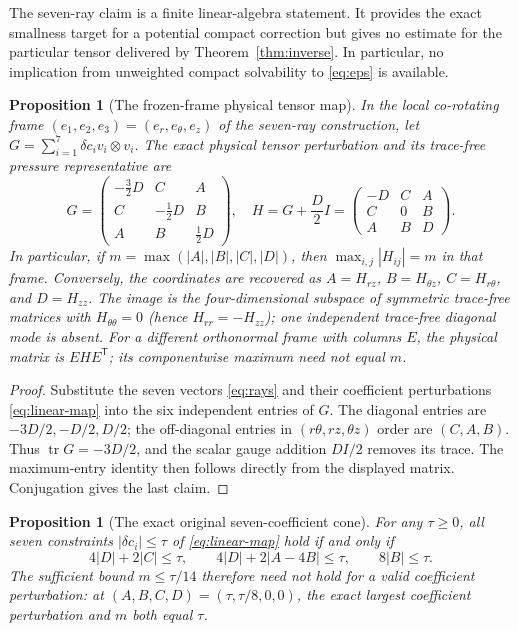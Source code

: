 \documentclass[11pt,a4paper]{article}
\theoremstyle{plain}
\newtheorem{proposition}[theorem]{Proposition}
\theoremstyle{definition}
\begin{document}
The seven-ray claim is a finite linear-algebra statement. It provides
the exact smallness target for a potential compact correction but gives
no estimate for the particular tensor delivered by
Theorem~\ref{thm:inverse}. In particular, no implication from
unweighted compact solvability to \eqref{eq:eps} is available.

\begin{proposition}[The frozen-frame physical tensor map]\label{prop:frame}
In the local co-rotating frame $(e_1,e_2,e_3)=(e_r,e_\theta,e_z)$
of the seven-ray construction, let
$G=\sum_{i=1}^7\delta c_i v_i\otimes v_i$.
The exact physical tensor perturbation and its trace-free pressure
representative are
\begin{equation}\label{eq:four-field-map}
 G=\begin{pmatrix}
 -\frac32D&C&A\\ C&-\frac12D&B\\ A&B&\frac12D
 \end{pmatrix},\quad
 H=G+\frac D2 I
 =\begin{pmatrix}-D&C&A\\ C&0&B\\ A&B&D\end{pmatrix}.
\end{equation}
In particular, if $m=\max(|A|,|B|,|C|,|D|)$, then
$\max_{i,j}|H_{ij}|=m$ in that frame.
Conversely, the coordinates are recovered as
$A=H_{rz}$, $B=H_{\theta z}$, $C=H_{r\theta}$, and $D=H_{zz}$.
The image is the four-dimensional subspace of symmetric trace-free
matrices with $H_{\theta\theta}=0$ (hence $H_{rr}=-H_{zz}$);
one independent trace-free diagonal mode is absent.
For a different orthonormal frame with columns $E$, the physical matrix
is $EHE^{\mathsf T}$; its componentwise maximum need not equal $m$.
\end{proposition}

\begin{proof}
Substitute the seven vectors \eqref{eq:rays} and their coefficient
perturbations \eqref{eq:linear-map} into the six independent entries
of $G$. The diagonal entries are $-3D/2,-D/2,D/2$; the off-diagonal
entries in $(r\theta,rz,\theta z)$ order are $(C,A,B)$.
Thus $\operatorname{tr}G=-3D/2$, and the scalar gauge addition
$D I/2$ removes its trace. The maximum-entry identity then follows
directly from the displayed matrix. Conjugation gives the last claim.
\end{proof}

\begin{proposition}[The exact original seven-coefficient cone]
\label{prop:exact-cone}
For any $\tau\ge0$, all seven constraints $|\delta c_i|\le\tau$
of \eqref{eq:linear-map} hold if and only if
\begin{equation}\label{eq:exact-cone}
 4|D|+2|C|\le\tau,\qquad
 4|D|+2|A-4B|\le\tau,\qquad
 8|B|\le\tau.
\end{equation}
The sufficient bound $m\le\tau/14$ therefore need not hold for a
valid coefficient perturbation: at
$(A,B,C,D)=(\tau,\tau/8,0,0)$, the exact largest coefficient
perturbation and $m$ both equal $\tau$.
\end{proposition}
\end{document}
